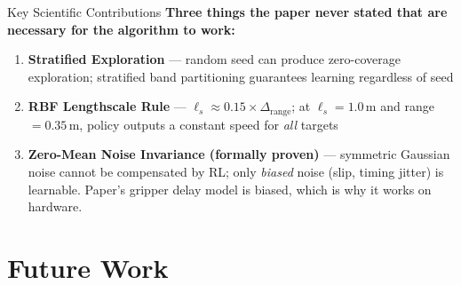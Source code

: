 \documentclass{if-beamer}
\begin{document}
\begin{frame}{Key Scientific Contributions}
    \textbf{Three things the paper never stated that are necessary for the algorithm to work:}

    \begin{enumerate}
        \item \textbf{Stratified Exploration} --- random seed can produce zero-coverage exploration; stratified band partitioning guarantees learning regardless of seed
        \vspace{0.3em}
        \item \textbf{RBF Lengthscale Rule} --- $\ell_s \approx 0.15 \times \Delta_\text{range}$; at $\ell_s = 1.0$\,m and range $= 0.35$\,m, policy outputs a constant speed for \textit{all} targets
        \vspace{0.3em}
        \item \textbf{Zero-Mean Noise Invariance (formally proven)} --- symmetric Gaussian noise cannot be compensated by RL; only \textit{biased} noise (slip, timing jitter) is learnable. Paper's gripper delay model is biased, which is why it works on hardware.
    \end{enumerate}

    \vspace{0.5em}
\end{frame}

\section{Future Work}
\end{document}
